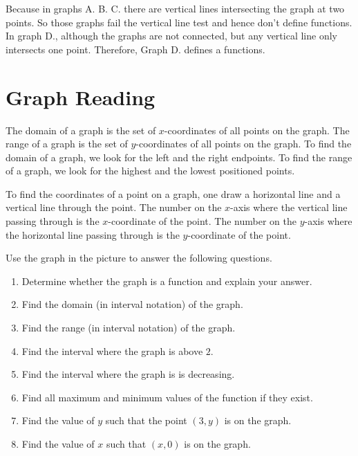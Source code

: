 \documentclass[en,12pt]{elegantbook}
\providecommand{\tightlist}{%
  \setlength{\itemsep}{0pt}\setlength{\parskip}{0pt}}
\providecommand{\tightlist}{%
  \setlength{\itemsep}{0pt}\setlength{\parskip}{0pt}}
\let\BeginKnitrBlock\begin \let\EndKnitrBlock\end
\begin{document}
\BeginKnitrBlock{solution}


Because in graphs A. B. C. there are vertical lines intersecting the graph at two points. So those graphs fail the vertical line test and hence don't define functions. In graph D., although the graphs are not connected, but any vertical line only intersects one point. Therefore, Graph D. defines a functions.
\EndKnitrBlock{solution}

\hypertarget{graph-reading}{%
\section{Graph Reading}\label{graph-reading}}

The domain of a graph is the set of \(x\)-coordinates of all points on the graph. The range of a graph is the set of \(y\)-coordinates of all points on the graph. To find the domain of a graph, we look for the left and the right endpoints. To find the range of a graph, we look for the highest and the lowest positioned points.

To find the coordinates of a point on a graph, one draw a horizontal line and a vertical line through the point. The number on the \(x\)-axis where the vertical line passing through is the \(x\)-coordinate of the point. The number on the \(y\)-axis where the horizontal line passing through is the \(y\)-coordinate of the point.

\BeginKnitrBlock{example}
\protect\hypertarget{exm:unnamed-chunk-223}{}{\label{exm:unnamed-chunk-223} }
Use the graph in the picture to answer the following questions.

\begin{enumerate}
\def\labelenumi{\arabic{enumi}.}
\tightlist
\item
  Determine whether the graph is a function and explain your answer.\\
\item
  Find the domain (in interval notation) of the graph.\\
\item
  Find the range (in interval notation) of the graph.\\
\item
  Find the interval where the graph is above \(2\).\\
\item
  Find the interval where the graph is is decreasing.\\
\item
  Find all maximum and minimum values of the function if they exist.\\
\item
  Find the value of \(y\) such that the point \((3, y)\) is on the graph.\\
\item
  Find the value of \(x\) such that \((x, 0)\) is on the graph.
\end{enumerate}
\EndKnitrBlock{example}
\end{document}
